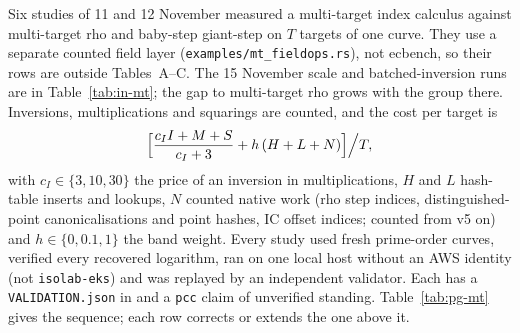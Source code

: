Six studies of 11 and 12 November measured a multi-target index calculus
against multi-target rho and baby-step giant-step on $T$ targets of one
curve. They use a separate counted field layer
(\texttt{examples/mt\_fieldops.rs}), not ecbench, so their rows are outside
Tables~A--C. The 15 November scale and batched-inversion runs are in
Table~\ref{tab:in-mt}; the gap to multi-target rho grows with the group
there. Inversions, multiplications and squarings are counted, and
the cost per target is
\[
  \Bigl[\frac{c_I I+M+S}{c_I+3}+h\,(H+L+N)\Bigr]\Big/T,
\]
with $c_I\in\{3,10,30\}$ the price of an inversion in multiplications, $H$
and $L$ hash-table inserts and lookups, $N$ counted native work (rho step
indices, distinguished-point canonicalisations and point hashes, IC offset
indices; counted from v5 on) and $h\in\{0,0.1,1\}$ the band weight. Every
study used fresh prime-order curves, verified every recovered logarithm, ran
on one local host without an AWS identity (not \texttt{isolab-eks}) and was
replayed by an independent validator. Each has a \texttt{VALIDATION.json}
in  and a \texttt{pcc} claim of unverified standing.
Table~\ref{tab:pg-mt} gives the sequence; each row corrects or extends the
one above it.

